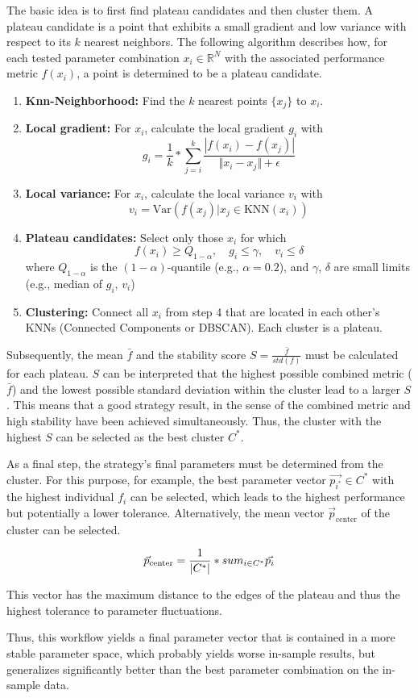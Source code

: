 The basic idea is to first find plateau candidates and then cluster them.
A plateau candidate is a point that exhibits a small gradient and low variance with respect to its $k$ nearest neighbors.
The following algorithm describes how, for each tested parameter combination $x_i \in \mathbb{R}^N$ with the associated performance metric $f(x_i)$, a point is determined to be a plateau candidate.

\begin{enumerate}
    \item \textbf{Knn-Neighborhood:} Find the $k$ nearest points $\{x_j\}$ to $x_i$.
    \item \textbf{Local gradient:} For $x_i$, calculate the local gradient $g_i$ with
    \[
        g_i = \frac{1}{k} * \sum_{j=i}^{k} \frac{|f(x_i) - f(x_j)|}{\Vert x_i - x_j \Vert + \epsilon}
    \]
    \item \textbf{Local variance:} For $x_i$, calculate the local variance $v_i$ with
    \[
        v_i = \text{Var}(f(x_j) | x_j \in \text{KNN}(x_i))
    \]
    \item \textbf{Plateau candidates:} Select only those $x_i$ for which
    \[
        f(x_i) \geq Q_{1-\alpha}, \quad g_i \leq \gamma, \quad v_i \leq \delta
    \]
    where $Q_{1-\alpha}$ is the $(1 - \alpha)$-quantile (e.g., $\alpha = 0.2$), and $\gamma$, $\delta$ are small limits (e.g., median of $g_i$, $v_i$)
    \item \textbf{Clustering:} Connect all $x_i$ from step 4 that are located in each other's KNNs (Connected Components or DBSCAN).
    Each cluster is a plateau.
\end{enumerate}

\noindent
Subsequently, the mean $\bar{f}$ and the stability score $S = \frac{\bar{f}}{std(f)}$ must be calculated for each plateau.
$S$ can be interpreted that the highest possible combined metric ($\bar{f}$) and the lowest possible standard deviation within the cluster lead to a larger $S$.
This means that a good strategy result, in the sense of the combined metric and high stability have been achieved simultaneously.
Thus, the cluster with the highest $S$ can be selected as the best cluster $C^\ast$.

As a final step, the strategy's final parameters must be determined from the cluster.
For this purpose, for example, the best parameter vector $\vec{p_{i^\ast}} \in C^\ast$ with the highest individual $f_i$ can be selected, which leads to the highest performance but potentially a lower tolerance.
Alternatively, the mean vector $\vec{p}_{\text{center}}$ of the cluster can be selected.

\[
    \vec{p}_{\text{center}} = \frac{1}{|C^\ast|} * \\sum_{i \in C^\ast} \vec{p_i}
\]

\noindent
This vector has the maximum distance to the edges of the plateau and thus the highest tolerance to parameter fluctuations.

Thus, this workflow yields a final parameter vector that is contained in a more stable parameter space, which probably yields worse in-sample results, but generalizes significantly better than the best parameter combination on the in-sample data.

